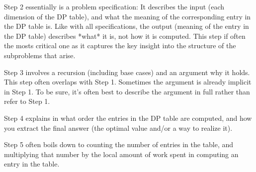 \documentclass[11pt]{article}
\begin{document}
Step 2 essentially is a problem specification: It describes the input
(each dimension of the DP table), and what the meaning of the
corresponding entry in the DP table is. Like with all specifications,
the output (meaning of the entry in the DP table) describes *what* it
is, not how it is computed. This step if often the mosts critical one as
it captures the key insight into the structure of the subproblems that
arise.

Step 3 involves a recursion (including base cases) and an argument why
it holds. This step often overlaps with Step 1. Sometimes the argument
is already implicit in Step 1. To be sure, it's often best to describe
the argument in full rather than refer to Step 1.

Step 4 explains in what order the entries in the DP table are computed,
and how you extract the final answer (the optimal value and/or a way to
realize it).

Step 5 often boils down to counting the number of entries in the table,
and multiplying that number by the local amount of work spent in
computing an entry in the table. 
\end{document}
